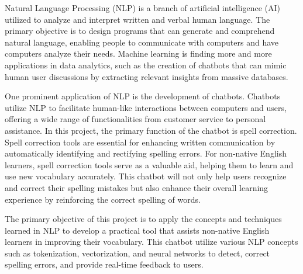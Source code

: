 \medskip

\hspace{10pt}Natural Language Processing (NLP) is a branch of artificial intelligence (AI) utilized to analyze and interpret written and verbal human language. The primary objective is to design programs that can generate and comprehend natural language, enabling people to communicate with computers and have computers analyze their needs.\cite{NLPFrank} Machine learning is finding more and more applications in data analytics, such as the creation of chatbots that can mimic human user discussions by extracting relevant insights from massive databases. \cite{NLPFrank}

\medskip

\hspace{10pt}One prominent application of NLP is the development of chatbots. Chatbots utilize NLP to facilitate human-like interactions between computers and users, offering a wide range of functionalities from customer service to personal assistance. In this project, the primary function of the chatbot is spell correction. Spell correction tools are essential for enhancing written communication by automatically identifying and rectifying spelling errors. For non-native English learners, spell correction tools serve as a valuable aid, helping them to learn and use new vocabulary accurately. This chatbot will not only help users recognize and correct their spelling mistakes but also enhance their overall learning experience by reinforcing the correct spelling of words.

\medskip

\hspace{10pt}The primary objective of this project is to apply the concepts and techniques learned in NLP to develop a practical tool that assists non-native English learners in improving their vocabulary. This chatbot utilize various NLP concepts such as tokenization, vectorization, and neural networks to detect, correct spelling errors, and provide real-time feedback to users.